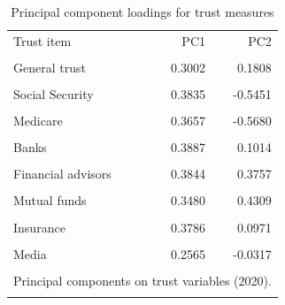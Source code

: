 \begin{table}[htbp]\centering\small
\setlength{\tabcolsep}{6pt}
\caption{Principal component loadings for trust measures}
\label{tab:trust_pca_loadings}
\begin{tabular}{lrr}\toprule
Trust item & PC1 & PC2 \\\\ \midrule
General trust & 0.3002 & 0.1808 \\\\
Social Security & 0.3835 & -0.5451 \\\\
Medicare & 0.3657 & -0.5680 \\\\
Banks & 0.3887 & 0.1014 \\\\
Financial advisors & 0.3844 & 0.3757 \\\\
Mutual funds & 0.3480 & 0.4309 \\\\
Insurance & 0.3786 & 0.0971 \\\\
Media & 0.2565 & -0.0317 \\\\
\bottomrule
\multicolumn{3}{l}{\footnotesize Principal components on trust variables (2020).} \\\\
\end{tabular}\end{table}

